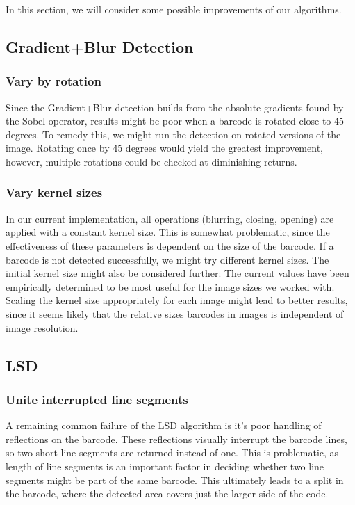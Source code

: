 In this section, we will consider some possible improvements of our algorithms.

\subsection{Gradient+Blur Detection}

\subsubsection{Vary by rotation}
Since the Gradient+Blur-detection builds from the absolute gradients found by the Sobel operator, results might be poor when a barcode is rotated close to 45 degrees. To remedy this, we might run the detection on rotated versions of the image. Rotating once by 45 degrees would yield the greatest improvement, however, multiple rotations could be checked at diminishing returns.

\subsubsection{Vary kernel sizes}
In our current implementation, all operations (blurring, closing, opening) are applied with a constant kernel size. This is somewhat problematic, since the effectiveness of these parameters is dependent on the size of the barcode. If a barcode is not detected successfully, we might try different kernel sizes.\newline
The initial kernel size might also be considered further: The current values have been empirically determined to be most useful for the image sizes we worked with. Scaling the kernel size appropriately for each image might lead to better results, since it seems likely that the relative sizes barcodes in images is independent of image resolution.


\subsection{LSD}
\subsubsection{Unite interrupted line segments}

A remaining common failure of the LSD algorithm is it's poor handling of reflections on the barcode. These reflections visually interrupt the barcode lines, so two short line segments are returned instead of one. This is problematic, as length of line segments is an important factor in deciding whether two line segments might be part of the same barcode. This ultimately leads to a split in the barcode, where the detected area covers just the larger side of the code.

